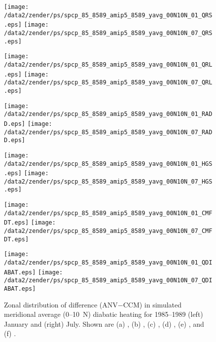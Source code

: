 \documentclass[twocolumn,final]{article}
\begin{document}
\begin{figure*}
\texttt{[image: /data2/zender/ps/spcp\_85\_8589\_amip5\_8589\_yavg\_00N10N\_01\_QRS.eps]}
\texttt{[image: /data2/zender/ps/spcp\_85\_8589\_amip5\_8589\_yavg\_00N10N\_07\_QRS.eps]}

\texttt{[image: /data2/zender/ps/spcp\_85\_8589\_amip5\_8589\_yavg\_00N10N\_01\_QRL.eps]}
\texttt{[image: /data2/zender/ps/spcp\_85\_8589\_amip5\_8589\_yavg\_00N10N\_07\_QRL.eps]}

\texttt{[image: /data2/zender/ps/spcp\_85\_8589\_amip5\_8589\_yavg\_00N10N\_01\_RADD.eps]}
\texttt{[image: /data2/zender/ps/spcp\_85\_8589\_amip5\_8589\_yavg\_00N10N\_07\_RADD.eps]}

\texttt{[image: /data2/zender/ps/spcp\_85\_8589\_amip5\_8589\_yavg\_00N10N\_01\_HGS.eps]}
\texttt{[image: /data2/zender/ps/spcp\_85\_8589\_amip5\_8589\_yavg\_00N10N\_07\_HGS.eps]}

\texttt{[image: /data2/zender/ps/spcp\_85\_8589\_amip5\_8589\_yavg\_00N10N\_01\_CMFDT.eps]}
\texttt{[image: /data2/zender/ps/spcp\_85\_8589\_amip5\_8589\_yavg\_00N10N\_07\_CMFDT.eps]}

\texttt{[image: /data2/zender/ps/spcp\_85\_8589\_amip5\_8589\_yavg\_00N10N\_01\_QDIABAT.eps]}
\texttt{[image: /data2/zender/ps/spcp\_85\_8589\_amip5\_8589\_yavg\_00N10N\_07\_QDIABAT.eps]}
\caption[Zonal distribution of difference (ANV$-$CCM) in simulated
meridional average (0--10~\degreee N) diabatic heating for 1985--1989
January and July.]{
Zonal distribution of difference (ANV$-$CCM) in simulated meridional
average (0--10~\degreee N) diabatic heating for 1985--1989 (left)
January and (right) July. 
Shown are (a) \QRL, (b) \QRS, (c) \QR, (d) \QLS, (e) \QC, and (f) \QT.
\label{fig:yavg_00N10N_8589_QT}}
\end{figure*}
\clearpage
\end{document}
